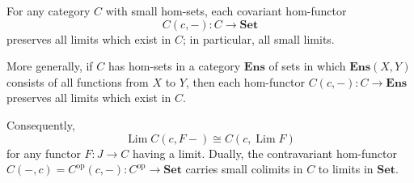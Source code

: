 For any category $C$ with small hom-sets, each covariant hom-functor
$$C(c, -) : C \rightarrow \mathbf{Set}$$
preserves all limits which exist in $C$; in particular, all small limits.

More generally, if $C$ has hom-sets in a category $\mathbf{Ens}$ of sets in which $\mathbf{Ens}(X, Y)$ consists of all functions from $X$ to $Y$, then each hom-functor $C(c, -) : C \rightarrow \mathbf{Ens}$ preserves all limits which exist in $C$.

Consequently,
$$\operatorname{Lim} C(c, F-) \cong C(c, \operatorname{Lim} F)$$
for any functor $F : J \rightarrow C$ having a limit. Dually, the contravariant hom-functor $C(-, c) = C^{\text{op}}(c, -) : C^{\text{op}} \rightarrow \mathbf{Set}$ carries small colimits in $C$ to limits in $\mathbf{Set}$.
